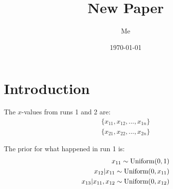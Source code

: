 \documentclass[a4paper, 11pt]{article}
\title{New Paper}
\author{Me}
\date{\today}
\begin{document}
\maketitle


\section{Introduction}
The $x$-values from runs 1 and 2 are:
\begin{eqnarray}
\{x_{11}, x_{12}, ..., x_{1n}\}\\
\{x_{21}, x_{22}, ..., x_{2n}\}
\end{eqnarray}

The prior for what happened in run 1 is:
\begin{eqnarray}
x_{11} \sim \textnormal{Uniform}(0, 1)\\
x_{12} | x_{11} \sim \textnormal{Uniform}(0, x_{11})\\
x_{13} | x_{11}, x_{12} \sim \textnormal{Uniform}(0, x_{12})
\end{eqnarray}
\end{document}
